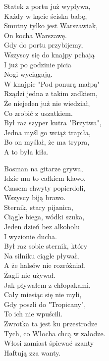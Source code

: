 \begin{multicols}{2}
Statek z portu już wypływa, \\
Każdy w kącie ściska babę, \\
Smutny tylko jest Warszawiak, \\
On kocha Warszawę.\\

Gdy do portu przybijemy, \\
Wszyscy się do knajpy pchają\\
I już po godzinie picia\\
Nogi wyciągają.\\

W knajpie "Pod ponurą małpą"\\
Rządzi jedna z takim zadkiem, \\
Że niejeden już nie wiedział, \\
Co zrobić z uszatkiem.\\

Był raz szyper kutra "Brzytwa", \\
Jedna myśl go wciąż trapiła, \\
Bo on myślał, że ma trypra, \\
A to była kiła.\\
\newcolumn

Bosman na gitarze grywa, \\
Idzie mu to całkiem klawo, \\
Czasem chwyty popierdoli, \\
Wszyscy biją brawo.\\

Sternik, stary pijanica, \\
Ciągle biega, wódki szuka, \\
Jeden dzień bez alkoholu\\
I wyzionie ducha.\\


Był raz sobie sternik, który\\
Na silniku ciągle pływał, \\
A że halsów nie rozróżniał, \\
Żagli nie używał.\\

Jak pływałem z chłopakami, \\
Cały miesiąc się nie myli, \\
Gdy poszli do "Tropicany", \\
To ich nie wpuścili.\\

Zwrotka ta jest ku przestrodze\\
Tych, co Włocha chcą w załodze.\\
Włosi zamiast śpiewać szanty\\
Haftują zza wanty.\\


\end{multicols}
